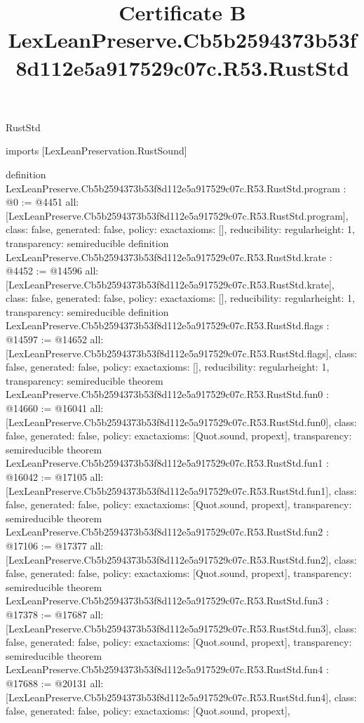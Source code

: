 \begin{lexlean}{RustStd}
\title{Certificate B LexLeanPreserve.Cb5b2594373b53f8d112e5a917529c07c.R53.RustStd}
\begin{coremodule}
imports [LexLeanPreservation.RustSound]

definition LexLeanPreserve.Cb5b2594373b53f8d112e5a917529c07c.R53.RustStd.program : @0 := @4451 {
  all: [LexLeanPreserve.Cb5b2594373b53f8d112e5a917529c07c.R53.RustStd.program],
  class: false,
  generated: false,
  policy: exact{axioms: []},
  reducibility: regular{height: 1},
  transparency: semireducible
}
definition LexLeanPreserve.Cb5b2594373b53f8d112e5a917529c07c.R53.RustStd.krate : @4452 := @14596 {
  all: [LexLeanPreserve.Cb5b2594373b53f8d112e5a917529c07c.R53.RustStd.krate],
  class: false,
  generated: false,
  policy: exact{axioms: []},
  reducibility: regular{height: 1},
  transparency: semireducible
}
definition LexLeanPreserve.Cb5b2594373b53f8d112e5a917529c07c.R53.RustStd.flags : @14597 := @14652 {
  all: [LexLeanPreserve.Cb5b2594373b53f8d112e5a917529c07c.R53.RustStd.flags],
  class: false,
  generated: false,
  policy: exact{axioms: []},
  reducibility: regular{height: 1},
  transparency: semireducible
}
theorem LexLeanPreserve.Cb5b2594373b53f8d112e5a917529c07c.R53.RustStd.fun0 : @14660 := @16041 {
  all: [LexLeanPreserve.Cb5b2594373b53f8d112e5a917529c07c.R53.RustStd.fun0],
  class: false,
  generated: false,
  policy: exact{axioms: [Quot.sound, propext]},
  transparency: semireducible
}
theorem LexLeanPreserve.Cb5b2594373b53f8d112e5a917529c07c.R53.RustStd.fun1 : @16042 := @17105 {
  all: [LexLeanPreserve.Cb5b2594373b53f8d112e5a917529c07c.R53.RustStd.fun1],
  class: false,
  generated: false,
  policy: exact{axioms: [Quot.sound, propext]},
  transparency: semireducible
}
theorem LexLeanPreserve.Cb5b2594373b53f8d112e5a917529c07c.R53.RustStd.fun2 : @17106 := @17377 {
  all: [LexLeanPreserve.Cb5b2594373b53f8d112e5a917529c07c.R53.RustStd.fun2],
  class: false,
  generated: false,
  policy: exact{axioms: [Quot.sound, propext]},
  transparency: semireducible
}
theorem LexLeanPreserve.Cb5b2594373b53f8d112e5a917529c07c.R53.RustStd.fun3 : @17378 := @17687 {
  all: [LexLeanPreserve.Cb5b2594373b53f8d112e5a917529c07c.R53.RustStd.fun3],
  class: false,
  generated: false,
  policy: exact{axioms: [Quot.sound, propext]},
  transparency: semireducible
}
theorem LexLeanPreserve.Cb5b2594373b53f8d112e5a917529c07c.R53.RustStd.fun4 : @17688 := @20131 {
  all: [LexLeanPreserve.Cb5b2594373b53f8d112e5a917529c07c.R53.RustStd.fun4],
  class: false,
  generated: false,
  policy: exact{axioms: [Quot.sound, propext]},
}
\end{coremodule}
\end{lexlean}
